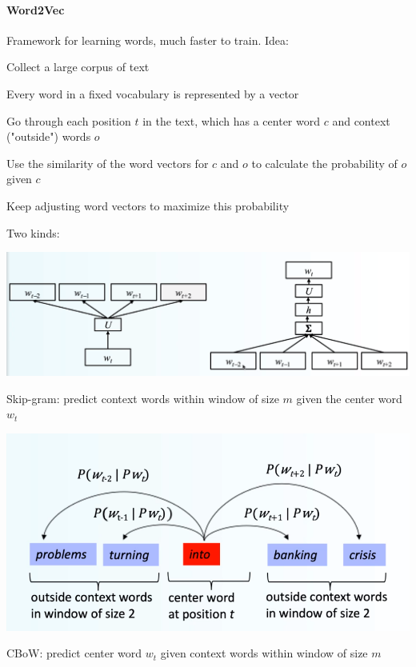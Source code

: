 \documentclass[10pt]{report}
\begin{document}
\paragraph{Word2Vec} Framework for learning words, much faster to train. Idea:\begin{list}{}{}
	\item Collect a large corpus of text
	\item Every word in a fixed vocabulary is represented by a vector
	\item Go through each position $t$ in the text, which has a center word $c$ and context ("outside") words $o$
	\item Use the similarity of the word vectors for $c$ and $o$ to calculate the probability of $o$ given $c$
	\item Keep adjusting word vectors to maximize this probability
\end{list}
Two kinds:
\begin{center}
	\includegraphics[scale=0.5]{3.png}
\end{center}
\begin{list}{}{}
	\item Skip-gram: predict context words within window of size $m$ given the center word $w_t$
	\begin{center}
		\includegraphics[scale=0.4]{4.png}
	\end{center}
	\item CBoW: predict center word $w_t$ given context words within window of size $m$
\end{list}
\end{document}

